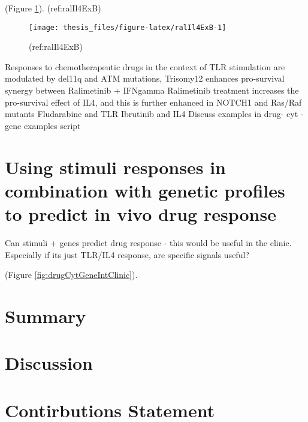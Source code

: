 \documentclass[11pt, a4paper, twosided]{book}
\begin{document}
(Figure \ref{fig:ralIl4ExB}).
(ref:ralIl4ExB)
\begin{figure}

{\centering \texttt{[image: thesis\_files/figure-latex/ralIl4ExB-1]} 

}

\caption{(ref:ralIl4ExB)}\label{fig:ralIl4ExB}
\end{figure}
Responses to chemotherapeutic drugs in the context of TLR stimulation are modulated by del11q and ATM mutations,
Trisomy12 enhances pro-survival synergy between Ralimetinib + IFNgamma
Ralimetinib treatment increases the pro-survival effect of IL4, and this is further enhanced in NOTCH1 and Ras/Raf mutants
Fludarabine and TLR
Ibrutinib and IL4
Discuss examples in drug- cyt -gene examples script

\hypertarget{using-stimuli-responses-in-combination-with-genetic-profiles-to-predict-in-vivo-drug-response}{%
\section{Using stimuli responses in combination with genetic profiles to predict in vivo drug response}\label{using-stimuli-responses-in-combination-with-genetic-profiles-to-predict-in-vivo-drug-response}}

Can stimuli + genes predict drug response - this would be useful in the clinic. Especially if its just TLR/IL4 response, are specific signals useful?

(Figure \ref{fig:drugCytGeneIntClinic}).



\hypertarget{summary-2}{%
\section{Summary}\label{summary-2}}

\hypertarget{discussion-2}{%
\section{Discussion}\label{discussion-2}}

\hypertarget{contirbutions-statement}{%
\section{Contirbutions Statement}\label{contirbutions-statement}}
\end{document}
